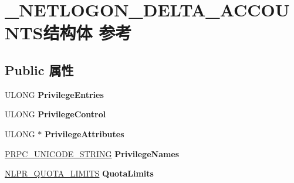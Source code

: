 \hypertarget{struct___n_e_t_l_o_g_o_n___d_e_l_t_a___a_c_c_o_u_n_t_s}{}\section{\+\_\+\+N\+E\+T\+L\+O\+G\+O\+N\+\_\+\+D\+E\+L\+T\+A\+\_\+\+A\+C\+C\+O\+U\+N\+T\+S结构体 参考}
\label{struct___n_e_t_l_o_g_o_n___d_e_l_t_a___a_c_c_o_u_n_t_s}
\subsection*{Public 属性}
\begin{DoxyCompactItemize}
\item 
\mbox{\label{struct___n_e_t_l_o_g_o_n___d_e_l_t_a___a_c_c_o_u_n_t_s_abe1f374b043f9b6dfeb39a6c2d4dc97e}} 
U\+L\+O\+NG {\bfseries Privilege\+Entries}
\item 
\mbox{\label{struct___n_e_t_l_o_g_o_n___d_e_l_t_a___a_c_c_o_u_n_t_s_aceed4ba25fe6688b5d8cc2cd8e95a3ab}} 
U\+L\+O\+NG {\bfseries Privilege\+Control}
\item 
\mbox{\label{struct___n_e_t_l_o_g_o_n___d_e_l_t_a___a_c_c_o_u_n_t_s_a2592e5850b1e782bde8debd6c048628a}} 
U\+L\+O\+NG $\ast$ {\bfseries Privilege\+Attributes}
\item 
\mbox{\label{struct___n_e_t_l_o_g_o_n___d_e_l_t_a___a_c_c_o_u_n_t_s_abc488b67c5c8d181f1999a8c3821d4b0}} 
\hyperlink{struct___r_p_c___u_n_i_c_o_d_e___s_t_r_i_n_g}{P\+R\+P\+C\+\_\+\+U\+N\+I\+C\+O\+D\+E\+\_\+\+S\+T\+R\+I\+NG} {\bfseries Privilege\+Names}
\item 
\mbox{\label{struct___n_e_t_l_o_g_o_n___d_e_l_t_a___a_c_c_o_u_n_t_s_aca3b93271af3a1309c1e9e07a6c4f754}} 
\hyperlink{struct___n_l_p_r___q_u_o_t_a___l_i_m_i_t_s}{N\+L\+P\+R\+\_\+\+Q\+U\+O\+T\+A\+\_\+\+L\+I\+M\+I\+TS} {\bfseries Quota\+Limits}
\item 
\mbox{\label{struct___n_e_t_l_o_g_o_n___d_e_l_t_a___a_c_c_o_u_n_t_s_a42b693e51998542af61c5861acbedcc2}} 

\end{DoxyCompactItemize}
